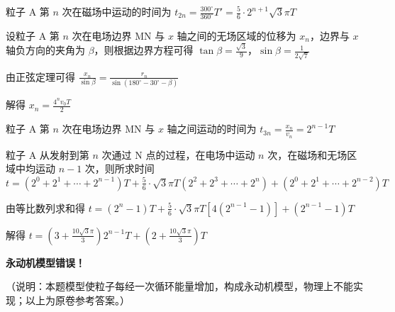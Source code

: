 \documentclass[\gkver]{gaokaozhenti}
\begin{document}
\begin{enumerate}
{粒子 A 第 $n$ 次在磁场中运动的时间为
$t_{2n}=\frac{300^\circ}{360^\circ}T'=\frac{5}{6}\cdot2^{n+1}\sqrt{3}\pi T$

设粒子 A 第 $n$ 次在电场边界 MN 与 $x$ 轴之间的无场区域的位移为 $x_{n}$，边界与 $x$ 轴负方向的夹角为 $\beta$，则根据边界方程可得
$\tan\beta=\frac{\sqrt{3}}{9}$，$\sin\beta=\frac{1}{2\sqrt{7}}$

由正弦定理可得
$\frac{x_{n}}{\sin\beta}=\frac{r_{n}}{\sin(180^\circ-30^\circ-\beta)}$

解得
$x_{n}=\frac{4^{n}v_{0}T}{2}$

粒子 A 第 $n$ 次在电场边界 MN 与 $x$ 轴之间运动的时间为
$t_{3n}=\frac{x_{n}}{v_{n}}=2^{n-1}T$

粒子 A 从发射到第 $n$ 次通过 N 点的过程，在电场中运动 $n$ 次，在磁场和无场区域中均运动 $n-1$ 次，则所求时间
$t=(2^{0}+2^{1}+\cdots+2^{n-1})T+\frac{5}{6}\cdot\sqrt{3}\pi T(2^{2}+2^{3}+\cdots+2^{n})+(2^{0}+2^{1}+\cdots+2^{n-2})T$

由等比数列求和得
$t=(2^{n}-1)T+\frac{5}{6}\cdot\sqrt{3}\pi T[4(2^{n-1}-1)]+(2^{n-1}-1)T$

解得
$t=(3+\frac{10\sqrt{3}\pi}{3})2^{n-1}T+(2+\frac{10\sqrt{3}\pi}{3})T$

\textbf{永动机模型错误！}

（说明：本题模型使粒子每经一次循环能量增加，构成永动机模型，物理上不能实现；以上为原卷参考答案。）
}

\end{enumerate}
\end{document}
